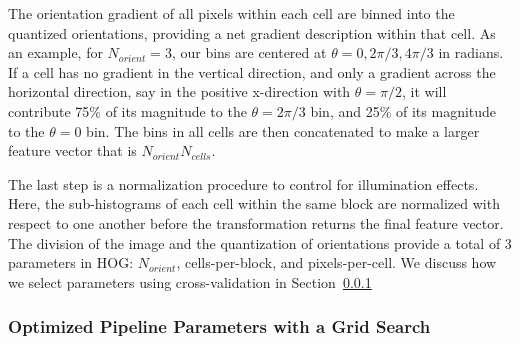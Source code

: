 \documentclass{emulateapj}
\begin{document}
The orientation gradient of all pixels within each cell are binned
into the quantized orientations, providing a net gradient description
within that cell.  As an example, for $N_{orient}=3$, our bins are
centered at $\theta=0, 2\pi/3, 4\pi/3$ in radians.  If a cell has no
gradient in the vertical direction, and only a gradient across the
horizontal direction, say in the positive x-direction with
$\theta=\pi/2$, it will contribute 75\% of its magnitude to the
$\theta=2\pi/3$ bin, and 25\% of its magnitude to the $\theta=0$ bin.
The bins in all cells are then concatenated to make a larger feature
vector that is $N_{orient}$\times$N_{cells}$.

The last step is a normalization procedure to control for illumination
effects.  Here, the sub-histograms of each cell within the same block
are normalized with respect to one another before the transformation
returns the final feature vector.  The division of the image and the
quantization of orientations provide a total of 3 parameters in HOG:
$N_{orient}$, cells-per-block, and pixels-per-cell.  We discuss how we
select parameters using cross-validation in
Section~\ref{sec:gridsearch}

\subsubsection{Optimized Pipeline Parameters with a Grid Search}\label{sec:gridsearch}
\end{document}
